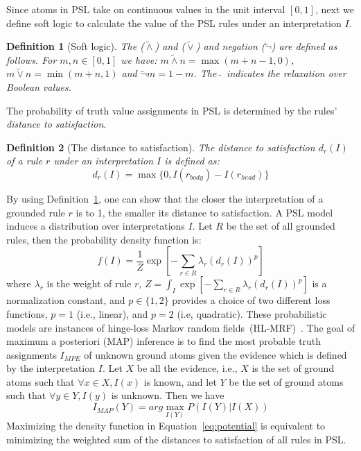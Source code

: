 \documentclass[11pt]{article}
\newtheorem{mydef}{\textbf{Definition}}
\begin{document}
Since atoms in PSL take on continuous values in the unit interval $[0,1]$, next we define soft logic to calculate the value of the PSL rules under an interpretation $I$.

\begin{mydef}[Soft logic]
\label{def:softlogic}
The ({$\tilde{\wedge}$}) and ({$\tilde{\vee}$}) and negation ({$\tilde{\neg}$}) are defined as follows. For {$m, n \in [0,1]$} we have: {$m \tilde{\wedge} n = \max(m+n -1, 0)$}, {$m \tilde{\vee} n = \min(m+n , 1)$} and {$\tilde{\neg} m = 1 - m$}. The $\, \tilde{} \,$ indicates the relaxation over Boolean values.
\end{mydef}

The probability of truth value assignments in PSL is determined by the rules' \emph{distance to satisfaction}.

\begin{mydef}[The distance to satisfaction]
The distance to satisfaction $d_{r}(I)$ of a rule $r$ under an interpretation $I$ is defined as:
{
\begin{equation}
d_{r}(I) = \max\{0, I(r_{body})-I(r_{head})\}
\end{equation}}
\end{mydef}

By using Definition~\ref{def:softlogic}, one can show that the closer the interpretation of a grounded rule $r$ is to 1, the smaller its distance to satisfaction. A PSL model induces a distribution over interpretations $I$. Let $R$ be the set of all grounded rules, then the probability density function is:
{
\begin{equation}
f(I) ={\frac{1}{Z}} \exp[-\sum_{r\in R} \lambda_{r}(d_{r}(I))^p]
\label{eq:potential}
\end{equation}
}
\noindent where { $\lambda_{r}$} is the weight of rule $r$, {
$Z = \int_{I} \exp[ -\sum_{r\in R} \lambda_{r}(d_{r}(I))^p]$
} is a normalization constant, and { $p \in \{1,2\}$} provides a choice of two different loss functions, $p=1$ (i.e., linear), and $p=2$ (i.e, quadratic). These probabilistic models are instances of hinge-loss Markov random fields~(HL-MRF)~\cite{bach:jmlr17}. The goal of maximum a posteriori (MAP) inference is to find the most probable truth assignments $I_{\textit{MPE}}$ of unknown ground atoms given the evidence which is defined by the interpretation $I$. Let $X$ be all the evidence, i.e., $X$ is the set of ground atoms such that $\forall x \in X, I(x)$ is known, and let $Y$ be the set of ground atoms such that $\forall y \in Y, I(y)$ is unknown. Then we have
{
\begin{equation}
I_{\textit{MAP}}(Y) = \textit{arg}\max_{I(Y)} P(I(Y)|I(X))
\end{equation}}
Maximizing the density function in Equation~\ref{eq:potential} is equivalent to minimizing the weighted sum of the distances to satisfaction of all rules in PSL. 
\end{document}
